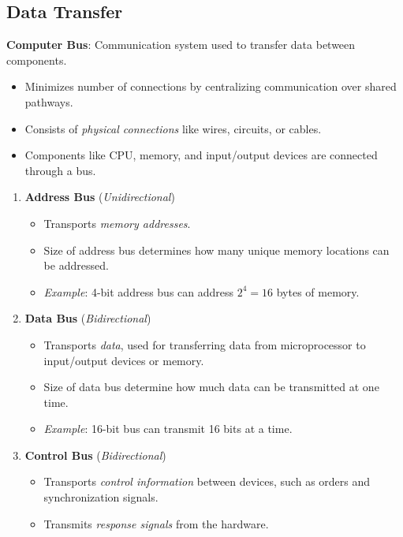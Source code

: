 \documentclass[12pt, letterpaper]{article}
\begin{document}

\subsection*{Data Transfer}

\textbf{Computer Bus}: Communication system used to transfer data between components.
\begin{itemize}
    \item Minimizes number of connections by centralizing communication over shared pathways.
    \item Consists of \textit{physical connections} like wires, circuits, or cables.
    \item Components like CPU, memory, and input/output devices are connected through a bus.
\end{itemize}

\begin{enumerate}
    \item \textbf{Address Bus} (\textit{Unidirectional})
        \begin{itemize}
            \item Transports \textit{memory addresses}.
            \item Size of address bus determines how many unique memory locations can be addressed.
            \item \textit{Example}: 4-bit address bus can address $ 2^4 = 16 $ bytes of memory.
        \end{itemize}
    \item \textbf{Data Bus} (\textit{Bidirectional})
        \begin{itemize}
            \item Transports \textit{data}, used for transferring data from microprocessor to input/output devices or memory.
            \item Size of data bus determine how much data can be transmitted at one time.
            \item \textit{Example}: 16-bit bus can transmit 16 bits at a time.
        \end{itemize}
    \item \textbf{Control Bus} (\textit{Bidirectional})
        \begin{itemize}
            \item Transports \textit{control information} between devices, such as orders and synchronization signals.
            \item Transmits \textit{response signals} from the hardware.
        \end{itemize}
\end{enumerate}
\end{document}
